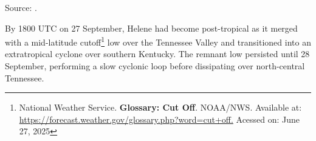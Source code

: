 \begin{table}[h!]
	\centering
	\caption{Highest Rainfall Totals by State recorded from 1200 UTC 25 September to 1200 UTC 28 September.}
	\label{tab:highest_rainfall_state}
	
	\vspace{2mm}
	{\centering Source: .\par}
\end{table}



By 1800 UTC on 27 September, Helene had become post-tropical as it merged with a mid-latitude cutoff\footnote{National Weather Service.\textbf{ Glossary: Cut Off}. NOAA/NWS. Available at: \url{https://forecast.weather.gov/glossary.php?word=cut+off.} Acessed on: June 27, 2025}  low over the Tennessee Valley and transitioned into an extratropical cyclone over southern Kentucky. The remnant low persisted until 28 September, performing a slow cyclonic loop before dissipating over north-central Tennessee.

